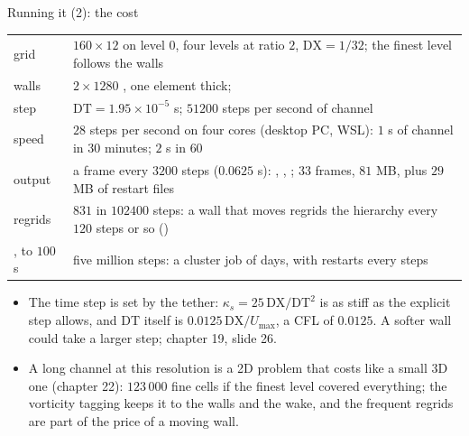 \documentclass[aspectratio=169,11pt]{beamer}
\begin{document}
\begin{frame}{Running it (2): the cost}
\label{fr:cost}
\footnotesize
\begin{center}
\begin{tabular}{@{}L{0.3\textwidth}L{0.62\textwidth}@{}}
\toprule
grid & $160\times12$ on level 0, four levels at ratio $2$, $\mathrm{DX} = 1/32$; the finest level follows the walls \\
walls & $2\times1280$ , one element thick;  \\
step & $\mathrm{DT} = 1.95\times10^{-5}$ s; $51200$ steps per second of channel \\
speed & $28$ steps per second on four cores (desktop PC, WSL): $1$ s of channel in $30$ minutes; $2$ s in $60$ \\
output & a frame every $3200$ steps ($0.0625$ s): , , ; $33$ frames, $81$ MB, plus $29$ MB of restart files \\
regrids & $831$ in $102400$ steps: a wall that moves regrids the hierarchy every $120$ steps or so () \\
,  to $100$ s & five million steps: a cluster job of days, with restarts every  steps \\
\bottomrule
\end{tabular}
\end{center}
\begin{itemize}
  \item The time step is set by the tether: $\kappa_s = 25\,\mathrm{DX}/\mathrm{DT}^2$ is as stiff as the explicit step allows, and $\mathrm{DT}$ itself is $0.0125\,\mathrm{DX}/U_{\max}$, a CFL of $0.0125$. A softer wall could take a larger step; chapter 19, slide 26.
  \item A long channel at this resolution is a 2D problem that costs like a small 3D one (chapter 22): $123\,000$ fine cells if the finest level covered everything; the vorticity tagging keeps it to the walls and the wake, and the frequent regrids are part of the price of a moving wall.
\end{itemize}
\end{frame}
\end{document}
